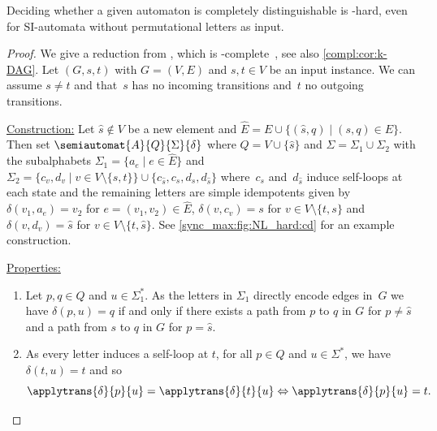 \begin{theorem} 
	\label{thm:cd_NL-hard}
	Deciding whether a given automaton is completely distinguishable
	is \NL-hard, even for SI-automata without permutational letters as input.
\end{theorem}
\begin{proof} 
	We give a reduction from , which is \NL-complete~\cite[Cor.~25]{Jones75}, see also \cref{compl:cor:k-DAG}.
	Let $(G, s,t)$
	with $G = (V, E)$ and $s,t \in V$
	be an input instance. We can assume $s \ne t$ and
	that~$s$ has no incoming transitions	and~$t$ no outgoing transitions.
	
	
	\medskip 
	\noindent\underline{Construction:} Let $\hat s \notin V$ be a new element
	and $\hat{E} = E \cup  \{ (\hat s, q) \mid (s, q) \in E \}$.
	Then set $\semiautomat{A}{Q}{\Sigma}{\delta}$
	where $Q = V \cup \{\hat s\}$ and $\Sigma = \Sigma_1 \cup \Sigma_2$
	with the subalphabets $\Sigma_1 = \{ a_e \mid e \in \hat{E} \}$
	and
	$\Sigma_2 = \{ c_v, d_v \mid v \in V \setminus \{s,t\} \} \cup \{ c_{\hat{s}}, c_s, d_s, d_{\hat{s}} \}$
	where~$c_s$ and~$d_{\hat{s}}$ induce self-loops at each state and the remaining letters
	are simple idempotents
	given by $\delta(v_1, a_{e}) = v_2$
	for $e = (v_1, v_2) \in \hat{E}$,
	$\delta(v, c_v) = s$ for $v \in V \setminus \{t,s\}$
	and $\delta(v, d_v) = \hat{s}$ for $v \in V \setminus\{t,\hat{s}\}$.
	See \cref{sync_max:fig:NL_hard:cd} 
	for an example construction.
	
	
	\medskip 	
	\noindent\underline{Properties:} 
	\begin{enumerate}
		\item \label{prop:1} Let  $p,q \in Q$ and $u \in \Sigma_1^*$. 
		As the letters in $\Sigma_1$
		directly encode edges in~$G$ 
		we have $\delta(p, u) = q$
		if and only if there exists a path from $p$ to $q$ in $G$
		for $p \ne \hat{s}$ and	a path from $s$ to $q$ in $G$ for $p = \hat{s}$.
		
		\item As every letter induces a self-loop at $t$, for all $p \in Q$ and $u \in \Sigma^*$,
		we have $\delta(t, u) = t$ and so
		\begin{equation}\label{sync_max:eqn:trap_state}
			\applytrans{\delta}{p}{u} = \applytrans{\delta}{t}{u}
			\Leftrightarrow 
			\applytrans{\delta}{p}{u} = t.
		\end{equation} 	
	\end{enumerate}
	

\end{proof}
